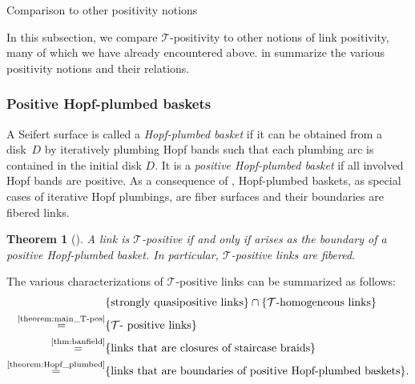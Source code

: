 \documentclass{amsart}
\makeatletter
\renewcommand\subsection{\@startsection{subsection}{2}%
  \z@{-.5\linespacing\@plus-.7\linespacing}{.5\linespacing}%
  {\normalfont\scshape}}
\theoremstyle{definition}
\theoremstyle{remark}
\theoremstyle{plain}
\newtheorem{theorem}[definition]{Theorem}%
\newcommand{\T}{\mathcal{T}}
\makeatother
\begin{document}
\subsection{Comparison to other positivity notions}\label{subsec:comparison}

In this subsection, we 
compare $\T$-positivity to other notions of link positivity, many of which we have already encountered above. 
 in  summarize the various positivity notions and their relations.

\subsubsection{Positive Hopf-plumbed baskets}\label{subsubsec:baskets}
A Seifert surface is called a \emph{Hopf-plumbed basket} if it can be obtained from a disk~$D$ by iteratively plumbing Hopf bands such that each plumbing arc is contained in the initial disk $D$. %
It is a \emph{positive Hopf-plumbed basket} if all involved Hopf bands are positive. 
As a consequence of , Hopf-plumbed baskets, as special cases of iterative Hopf plumbings, are fiber surfaces and their boundaries are fibered links.

\begin{theorem}[{\cite{Rudolph_Hopf_plumbing}}]\label{theorem:Hopf_plumbed}
    A link is $\mathcal{T}$-positive if and only if arises as the boundary of a positive Hopf-plumbed basket. In particular, $\mathcal{T}$-positive links are fibered.
\end{theorem}

The various characterizations of $\T$-positive links can be summarized as follows: 
    \begin{align}\label{eq:summary}
        \begin{split}
            & \{ \text{strongly quasipositive links}\} \cap \{\T\text{-homogeneous links} \}         \\         \stackrel{\text{\Cref{theorem:main_T-pos}}}{=} &\{\T\text{- positive links} \}
            \\\stackrel{\text{\Cref{thm:banfield}}}{=}& \{ \text{links that are closures of staircase braids} \} \\
            \stackrel{\text{\Cref{theorem:Hopf_plumbed}}}{=} 
             & \{ \text{links that are boundaries of positive Hopf-plumbed baskets}\}. 
        \end{split}
    \end{align}
\end{document}

